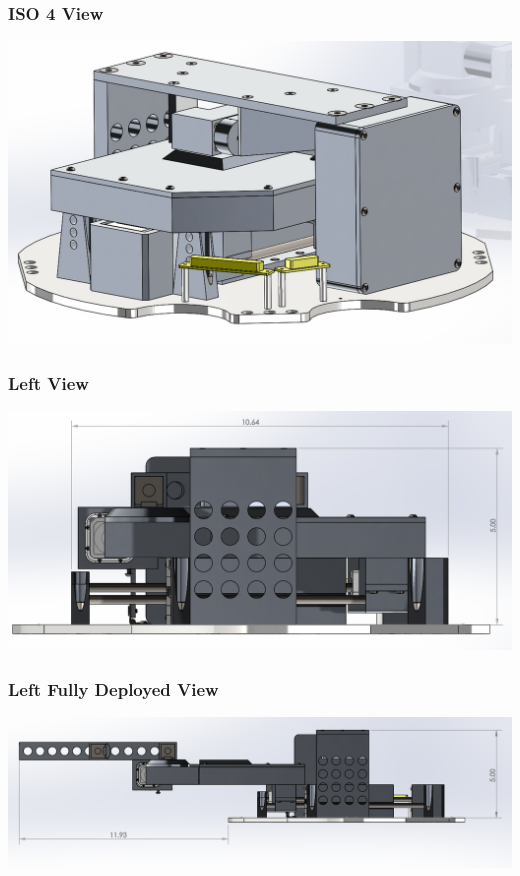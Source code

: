 \subsubsection{ISO 4 View}
\includegraphics[width=\textwidth]{./images/CAD/ISO_4}
\subsubsection{Left View}
\includegraphics[width=\textwidth]{./images/CAD/LEFT}
\subsubsection{Left Fully Deployed View}
\includegraphics[width=\textwidth]{./images/CAD/LEFT_DEPLOYED_FULL}
